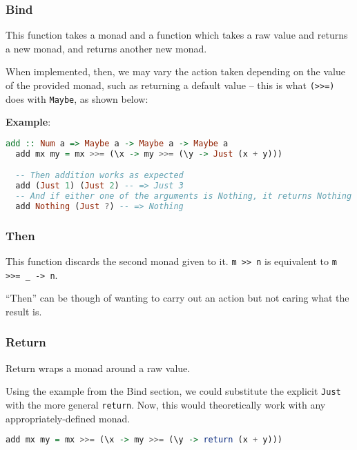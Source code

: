 \subsubsection{Bind}
This function takes a monad and a function which takes a raw value and returns a new monad, and returns another new monad.

When implemented, then, we may vary the action taken depending on the value of the provided monad, such as returning a default value -- this is what \texttt{(>>=)} does with \texttt{Maybe}, as shown below: 

\textbf{Example}:
\begin{lstlisting}[language=haskell]
  add :: Num a => Maybe a -> Maybe a -> Maybe a
  add mx my = mx >>= (\x -> my >>= (\y -> Just (x + y)))

  -- Then addition works as expected
  add (Just 1) (Just 2) -- => Just 3
  -- And if either one of the arguments is Nothing, it returns Nothing
  add Nothing (Just ?) -- => Nothing
\end{lstlisting}

\subsubsection{Then}

This function discards the second monad given to it. \texttt{m >> n} is equivalent to \texttt{m >>= \_ -> n}.

``Then'' can be though of wanting to carry out an action but not caring what the result is.

\subsubsection{Return}

Return wraps a monad around a raw value.

Using the example from the Bind section, we could substitute the explicit \texttt{Just} with the more general \texttt{return}. Now, this would theoretically work with any appropriately-defined monad.

\begin{lstlisting}[language=haskell]
  add mx my = mx >>= (\x -> my >>= (\y -> return (x + y)))
\end{lstlisting}

